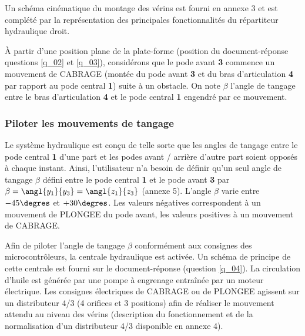 Un schéma cinématique du montage des vérins est fourni en annexe 3 et est complété par la représentation des
principales fonctionnalités du répartiteur hydraulique droit.



À partir d’une position plane de la plate-forme (position du document-réponse questions \ref{q_02} et \ref{q_03}), considérons que le pode avant \textbf{3} commence un mouvement de CABRAGE (montée du pode avant \textbf{3} et du bras d’articulation \textbf{4} par rapport au pode central \textbf{1}) suite à un obstacle. On note $\beta$ l’angle de tangage entre le bras d’articulation \textbf{4} et le pode central \textbf{1} engendré par ce mouvement.


\subsubsection{Piloter les mouvements de tangage}
Le système hydraulique est conçu de telle sorte que les angles de tangage entre le pode central \textbf{1} d’une part et les
podes avant / arrière d’autre part soient opposés à chaque instant. Ainsi, l’utilisateur n’a besoin de définir qu’un seul
angle de tangage $\beta$ défini entre le pode central \textbf{1} et le pode avant \textbf{3} par $\beta=\angl{y_1}{y_3}=\angl{z_1}{z_3}$ (annexe 5). L’angle
$\beta$
varie entre $- 45\degres$ et $+30\degres$. Les valeurs négatives correspondent à un mouvement de PLONGEE du pode avant, les
valeurs positives à un mouvement de CABRAGE.

Afin de piloter l’angle de tangage $\beta$ conformément aux consignes des microcontrôleurs, la centrale hydraulique est activée. Un schéma de principe de cette centrale est fourni sur le document-réponse (question \ref{q_04}). La circulation d’huile est générée par une pompe à engrenage entraînée par un moteur électrique. Les consignes électriques de CABRAGE ou de PLONGEE agissent sur un distributeur 4/3 (4 orifices et 3 positions) afin de réaliser le mouvement attendu au niveau des vérins (description du fonctionnement et de la normalisation d’un distributeur 4/3 disponible en annexe 4).

